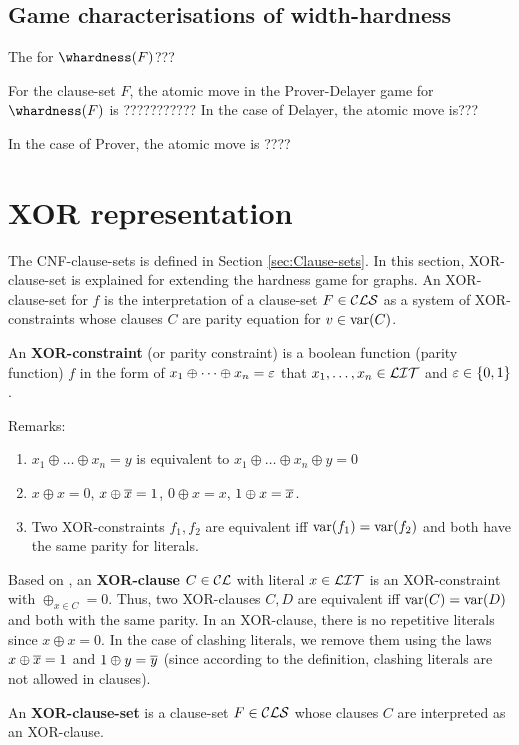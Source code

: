 \documentclass{report}
\begin{document}
\subsection{Game characterisations of width-hardness}
\label{sec:game-whdf}
The for $\whardness(F)$???

\begin{defi}\label{def:atomic-move}
For the clause-set $F$, the atomic move in the Prover-Delayer game for $\whardness(F)$ is ???????????
In the case of Delayer, the atomic move is???

In the case of Prover, the atomic move is ????
\end{defi}
\section{XOR representation}
\label{sec:XOR representation}
The CNF-clause-sets is defined in Section \ref{sec:Clause-sets}. In this section, XOR-clause-set is explained for extending the hardness game for graphs. An XOR-clause-set for $f$ is the interpretation of a clause-set $F \in \mathcal{CLS}$ as a system of XOR-constraints whose clauses $C$ are parity equation for $v \in \operatorname{var}(C)$. 

\begin{defi}\label{def:xor-const} 
An \textbf{XOR-constraint} (or parity constraint) is a boolean function (parity function) $f$ in the form of $x_1 \oplus \dots \oplus x_n = \varepsilon$ that $x_1, \dots, x_n \in \mathcal{LIT}$ and $\varepsilon \in \{ 0,1 \}$.
\end{defi}

Remarks:
\begin{enumerate}
    \item $x_1 \oplus \dots \oplus x_n = y$ is equivalent to $x_1 \oplus \dots \oplus x_n \oplus y = 0$
    \item $x \oplus x = 0$, $x \oplus \overline{x} = 1$, $0 \oplus x = x$, $1 \oplus x = \overline{x}$.
    \item Two XOR-constraints $f_1, f_2$ are equivalent iff $\operatorname{var}(f_1) = \operatorname{var}(f_2)$ and both have the same parity for literals.
\end{enumerate}

\begin{defi}\label{def:xor-cls}
Based on \cite{GwynneKullmann2013GoodRepresentationsIIex}, an \textbf{XOR-clause} $C \in \mathcal{CL}$ with literal $x \in \mathcal{LIT}$ is an XOR-constraint with $\oplus_{x \in C} = 0$. Thus, two XOR-clauses $C, D$ are equivalent iff $\operatorname{var}(C) = \operatorname{var}(D)$ and both with the same parity. In an XOR-clause, there is no repetitive literals since $x \oplus x = 0$. In the case of clashing literals, we remove them using the laws $x \oplus \overline{x} = 1$ and $1 \oplus y = \overline{y}$ (since according to the definition, clashing literals are not allowed in clauses).

An \textbf{XOR-clause-set} is a clause-set $F \in \mathcal{CLS}$ whose clauses $C$ are interpreted as an XOR-clause.  
\end{defi} 
\end{document}
